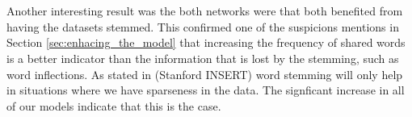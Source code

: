 \\\\
Another interesting result was the both networks were that both benefited from having the datasets stemmed. This confirmed one of the suspicions mentions in Section \ref{sec:enhacing_the_model} that increasing the frequency of shared words is a better indicator than the information that is lost by the stemming, such as word inflections. As stated in (Stanford INSERT) word stemming will only help in situations where we have sparseness in the data. The signficant increase in all of our models indicate that this is the case.
